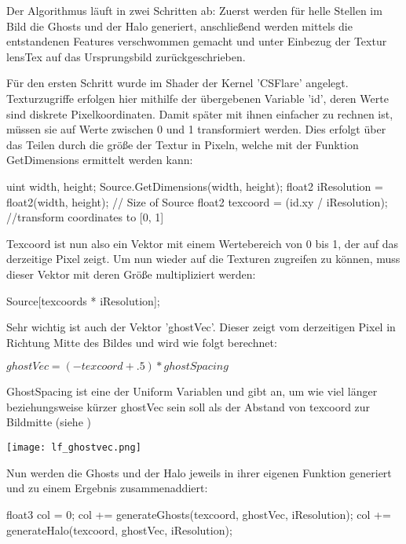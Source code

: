 Der Algorithmus läuft in zwei Schritten ab: Zuerst werden für helle Stellen im Bild die Ghosts und der Halo generiert, anschlie{\ss}end werden mittels  die entstandenen Features verschwommen gemacht und unter Einbezug der Textur lensTex auf das Ursprungsbild zurückgeschrieben.

Für den ersten Schritt wurde im Shader der Kernel 'CSFlare' angelegt. Texturzugriffe erfolgen hier mithilfe der übergebenen Variable 'id', deren Werte sind diskrete Pixelkoordinaten. Damit später mit ihnen einfacher zu rechnen ist, müssen sie auf Werte zwischen 0 und 1 transformiert werden. Dies erfolgt über das Teilen durch die grö{\ss}e der Textur in Pixeln, welche mit der Funktion GetDimensions ermittelt werden kann:

\begin{hlsl}
uint width, height;
Source.GetDimensions(width, height);
float2 iResolution = float2(width, height); // Size of Source
float2 texcoord = (id.xy / iResolution); //transform coordinates to [0, 1]
\end{hlsl}

Texcoord ist nun also ein Vektor mit einem Wertebereich von 0 bis 1, der auf das derzeitige Pixel zeigt. Um nun wieder auf die Texturen zugreifen zu können, muss dieser Vektor mit deren Grö{\ss}e multipliziert werden:

\begin{hlsl}
Source[texcoords * iResolution];
\end{hlsl}

Sehr wichtig ist auch der Vektor 'ghostVec'. Dieser zeigt vom derzeitigen Pixel in Richtung Mitte des Bildes und wird wie folgt berechnet:

$ghostVec = ( -texcoord + .5 ) * ghostSpacing$

GhostSpacing ist eine der Uniform Variablen und gibt an, um wie viel länger beziehungsweise kürzer ghostVec sein soll als der Abstand von texcoord zur Bildmitte (siehe )

\captionsetup{type=figure}
\texttt{[image: lf\_ghostvec.png]}
\label{img:lfghostvec}

Nun werden die Ghosts und der Halo jeweils in ihrer eigenen Funktion generiert und zu einem Ergebnis zusammenaddiert:

\begin{hlsl}
float3 col = 0;
col += generateGhosts(texcoord, ghostVec, iResolution);
col += generateHalo(texcoord, ghostVec, iResolution);
\end{hlsl}

